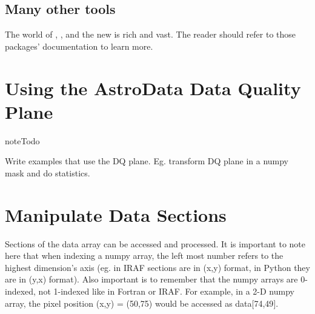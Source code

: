 \documentclass[letterpaper,10pt,english]{sphinxmanual}
\begin{document}
\subsection{Many other tools}
\label{data:many-other-tools}
The world of , , and the new  is rich and vast.
The reader should refer to those packages' documentation to learn more.


\section{Using the AstroData Data Quality Plane}
\label{data:using-the-astrodata-data-quality-plane}
\begin{notice}{note}{Todo}

Write examples that use the DQ plane.  Eg. transform DQ plane in a numpy
mask and do statistics.
\end{notice}


\section{Manipulate Data Sections}
\label{data:manipulate-data-sections}
Sections of the data array can be accessed and processed.  It is important to
note here that when indexing a numpy array, the left most number refers to the
highest dimension's axis (eg. in IRAF sections are in (x,y) format, in Python
they are in (y,x) format). Also important is to remember that the numpy arrays
are 0-indexed, not 1-indexed like in Fortran or IRAF.  For example, in a 2-D
numpy array, the pixel position (x,y) = (50,75) would be accessed as
data{[}74,49{]}.
\end{document}
